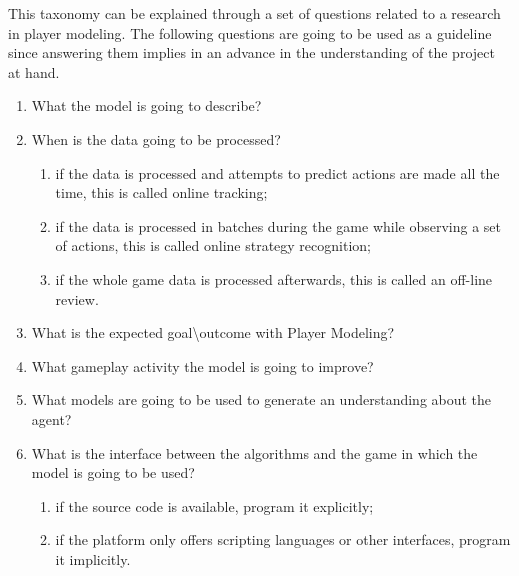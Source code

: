 This taxonomy can be explained through a set of questions related to a research in player modeling. The following questions
are going to be used as a guideline since answering them implies in an advance in the understanding of the project at hand.

\begin{enumerate}
	\item What the model is going to describe?
	\item When is the data going to be processed?
	      \begin{enumerate}
		      \item if the data is processed and attempts to predict actions are made all the time, this is called online tracking;
		      \item if the data is processed in batches during the game while observing a set of actions, this is called online strategy recognition;
		      \item if the whole game data is processed afterwards, this is called an off-line review.
	      \end{enumerate}
	\item What is the expected goal\textbackslash{}outcome with Player Modeling?
	\item What gameplay activity the model is going to improve?
	\item What models are going to be used to generate an understanding about the agent?
	\item What is the interface between the algorithms and the game in which the model is going to be used?
	\begin{enumerate}
		\item if the source code is available, program it explicitly;
		\item if the platform only offers scripting languages or other interfaces, program it implicitly.
	\end{enumerate}
\end{enumerate}